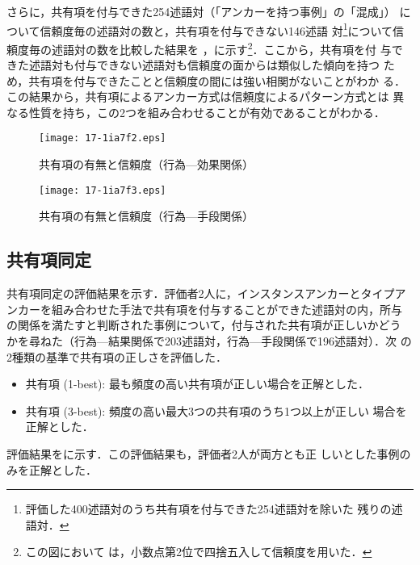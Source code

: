 \documentclass[japanese]{jnlp_1.4}
\begin{document}
さらに，共有項を付与できた254述語対（「アンカーを持つ事例」の「混成」）
について信頼度毎の述語対の数と，共有項を付与できない146述語
対\footnote{評価した400述語対のうち共有項を付与できた254述語対を除いた
  残りの述語対．}について信頼度毎の述語対の数を比較した結果を
，に示す\footnote{この図において
  は，小数点第2位で四捨五入して信頼度を用いた．}．ここから，共有項を付
与できた述語対も付与できない述語対も信頼度の面からは類似した傾向を持つ
ため，共有項を付与できたことと信頼度の間には強い相関がないことがわか
る．この結果から，共有項によるアンカー方式は信頼度によるパターン方式とは
異なる性質を持ち，この2つを組み合わせることが有効であることがわかる．


\begin{figure}[b]
\begin{minipage}[t]{.45\textwidth}
\begin{center}
\texttt{[image: 17-1ia7f2.eps]}
      \caption{共有項の有無と信頼度（行為—効果関係）}
      \label{fig:effect_shared}
\end{center}
\end{minipage}
\hfill
\begin{minipage}[t]{.45\textwidth}
\begin{center}
 \texttt{[image: 17-1ia7f3.eps]}
      \caption{共有項の有無と信頼度（行為—手段関係）}
      \label{fig:means_shared}
\end{center}
\end{minipage}
\end{figure}


\subsection{共有項同定}

共有項同定の評価結果を示す．評価者2人に，インスタンスアンカーとタイプア
ンカーを組み合わせた手法で共有項を付与することができた述語対の内，所与
の関係を満たすと判断された事例について，付与された共有項が正しいかどう
かを尋ねた（行為—結果関係で203述語対，行為—手段関係で196述語対）．次
の2種類の基準で共有項の正しさを評価した．
\begin{itemize}
\item 共有項 (1-best): 最も頻度の高い共有項が正しい場合を正解とした．
\item 共有項 (3-best): 頻度の高い最大3つの共有項のうち1つ以上が正しい
  場合を正解とした．
\end{itemize}
評価結果をに示す．この評価結果も，評価者2人が両方とも正
しいとした事例のみを正解とした．
\end{document}
